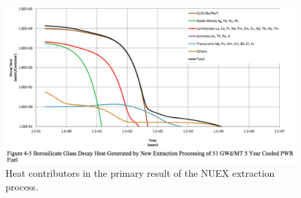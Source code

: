 \begin{figure}[htbp!]
  \begin{center}
    \includegraphics[width=0.7\textheight]{carter_nuex_heat.eps}
  \end{center}
  \caption{Heat contributors in the primary result of the NUEX extraction 
    process\cite{carter_us_2011}.}
  \label{fig:carter_nuex_heat}
\end{figure}
